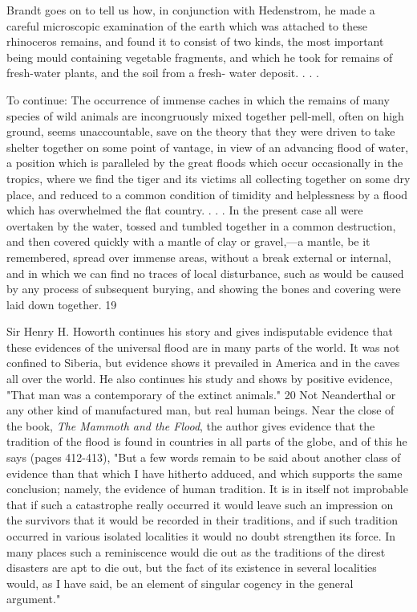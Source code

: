 Brandt goes on to tell us how, in conjunction with Hedenstrom, he made a careful
microscopic examination of the earth which was attached to these rhinoceros remains, and
found it to consist of two kinds, the most important being mould containing vegetable
fragments, and which he took for remains of fresh-water plants, and the soil from a fresh-
water deposit. . . .

To continue: The occurrence of immense caches in which the remains of many species of
wild animals are incongruously mixed together pell-mell, often on high ground, seems
unaccountable, save on the theory that they were driven to take shelter together on some
point of vantage, in view of an advancing flood of water, a position which is paralleled by the
great floods which occur occasionally in the tropics, where we find the tiger and its victims
all collecting together on some dry place, and reduced to a common condition of timidity and
helplessness by a flood which has overwhelmed the flat country. . . . In the present case all
were overtaken by the water, tossed and tumbled together in a common destruction, and then
covered quickly with a mantle of clay or gravel,—a mantle, be it remembered, spread over
immense areas, without a break external or internal, and in which we can find no traces of
local disturbance, such as would be caused by any process of subsequent burying, and
showing the bones and covering were laid down together. 19

Sir Henry H. Howorth continues his story and gives indisputable evidence that these
evidences of the universal flood are in many parts of the world. It was not confined to
Siberia, but evidence shows it prevailed in America and in the caves all over the world. He
also continues his study and shows by positive evidence, "That man was a contemporary of
the extinct animals." 20 Not Neanderthal or any other kind of manufactured man, but real
human beings. Near the close of the book, \textit{The Mammoth and the Flood}, the author gives
evidence that the tradition of the flood is found in countries in all parts of the globe, and of
this he says (pages 412-413), "But a few words remain to be said about another class of
evidence than that which I have hitherto adduced, and which supports the same conclusion;
namely, the evidence of human tradition. It is in itself not improbable that if such a
catastrophe really occurred it would leave such an impression on the survivors that it would
be recorded in their traditions, and if such tradition occurred in various isolated localities it
would no doubt strengthen its force. In many places such a reminiscence would die out as the
traditions of the direst disasters are apt to die out, but the fact of its existence in several
localities would, as I have said, be an element of singular cogency in the general argument."

